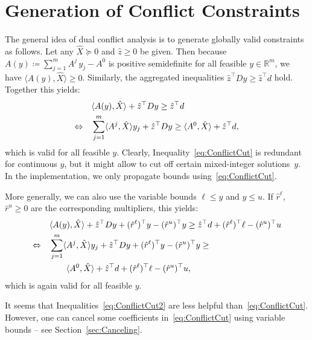 \documentclass[10pt, a4paper]{article}
\newcommand{\define}{\coloneqq}
\newcommand{\skal}[2]{\langle{#1},{#2}\rangle}
\newcommand{\T}{^{\top}}
\newcommand{\R}{\mathds{R}}
\begin{document}
\section{Generation of Conflict Constraints}

The general idea of dual conflict analysis is to generate globally valid
constraints as follows. Let any $\hat{X} \succeq 0$ and $\hat{z} \geq 0$ be
given. Then because $A(y) \define \sum_{j=1}^m A^j\, y_j - A^0$ is positive
semidefinite for all feasible $y \in \R^m$, we have
$\skal{A(y)}{\hat{X}} \geq 0$.  Similarly, the aggregated inequalities
$\hat{z}\T D y \geq \hat{z}\T d$ hold. Together this yields:
\begin{align}
  & \skal{A(y)}{\hat{X}} + \hat{z}\T D y \geq \hat{z}\T d\notag\\
  \Leftrightarrow\quad
  & \sum_{j=1}^m \skal{A^j}{\hat{X}} y_j + \hat{z}\T D y \geq
    \skal{A^0}{\hat{X}} + \hat{z}\T d,\label{eq:ConflictCut}
\end{align}
which is valid for all feasible $y$. Clearly,
Inequality~\eqref{eq:ConflictCut} is redundant for continuous $y$, but it
might allow to cut off certain mixed-integer solutions~$y$. In the implementation,
we only propagate bounds using~\eqref{eq:ConflictCut}.

More generally, we can also use the variable bounds $\ell \leq y$ and
$y \leq u$. If $\hat{r}^\ell$, $\hat{r}^u \geq 0$ are the corresponding
multipliers, this yields:
\begin{align}
  & \skal{A(y)}{\hat{X}} + \hat{z}\T D y + (\hat{r}^\ell)\T y - (\hat{r}^u)\T y
    \geq \hat{z}\T d + (\hat{r}^\ell)\T \ell - (\hat{r}^u)\T u\notag\\
  \Leftrightarrow\quad
  & \sum_{j=1}^m \skal{A^j}{\hat{X}} y_j + \hat{z}\T D y +
    (\hat{r}^\ell)\T y - (\hat{r}^u)\T y \geq \\
  & \qquad \skal{A^0}{\hat{X}} +
    \hat{z}\T d + (\hat{r}^\ell)\T \ell - (\hat{r}^u)\T u,\label{eq:ConflictCut2}
\end{align}
which is again valid for all feasible $y$.

It seems that Inequalities~\eqref{eq:ConflictCut2} are less helpful
than~\eqref{eq:ConflictCut}. However, one can cancel some coefficients
in~\eqref{eq:ConflictCut} using variable bounds -- see
Section~\ref{sec:Canceling}.

\end{document}
